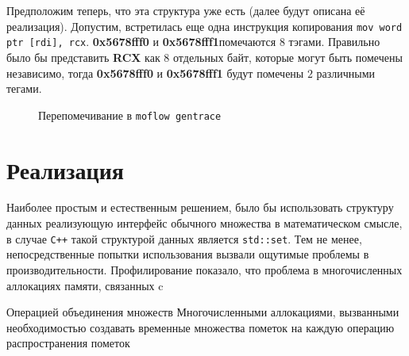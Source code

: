 Предположим теперь, что эта структура уже есть (далее будут описана её реализация). Допустим, встретилась еще одна инструкция копирования \texttt{mov word ptr [rdi], rcx}. \textbf{0x5678fff0} и \textbf{0x5678fff1}помечаются $8$ тэгами. Правильно было бы представить \textbf{RCX} как 8 отдельных байт, которые могут быть помечены независимо, тогда \textbf{0x5678fff0} и \textbf{0x5678fff1} будут помечены $2$ различными тегами.

\begin{figure}[H]
    \caption{Перепомечивание в \texttt{moflow gentrace}}
    \label{fig:moflow3}
\end{figure}

\section{Реализация }

Наиболее простым и естественным решением, было бы использовать структуру данных реализующую интерфейс обычного множества в математическом смысле, в случае \texttt{C++} такой структурой данных является \texttt{std::set}. Тем не менее, непосредственные попытки использования вызвали ощутимые проблемы в производительности. Профилирование показало, что проблема в многочисленных аллокациях памяти, связанных c

\begin{itemize}
    \text Операцией объединения множеств
    \text Многочисленными аллокациями, вызванными необходимостью создавать временные множества пометок на каждую операцию распространения пометок
\end{itemize}

